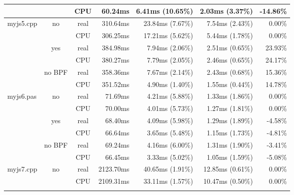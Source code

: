 \documentclass[en]{pracamgr}
\begin{document}
\begin{appendices}
\begin{small}
\begin{longtable}{|l|c|c|r|r|r|r|}
                            &                         & CPU  & 60.24ms & 6.41ms (10.65\%) & 2.03ms (3.37\%) & -14.86\% \\
\hline
\multirow{6}{*}{myjs5.cpp}  & \multirow{2}{*}{no}     & real & 310.64ms & 23.84ms (7.67\%) & 7.54ms (2.43\%) & 0.00\% \\*
                            &                         & CPU  & 306.25ms & 17.21ms (5.62\%) & 5.44ms (1.78\%) & 0.00\% \\*
                            \cline{2-7}
                            & \multirow{2}{*}{yes}    & real & 384.98ms & 7.94ms (2.06\%) & 2.51ms (0.65\%) & 23.93\% \\*
                            &                         & CPU  & 380.27ms & 7.79ms (2.05\%) & 2.46ms (0.65\%) & 24.17\% \\*
                            \cline{2-7}
                            & \multirow{2}{*}{no BPF} & real & 358.36ms & 7.67ms (2.14\%) & 2.43ms (0.68\%) & 15.36\% \\*
                            &                         & CPU  & 351.52ms & 4.90ms (1.40\%) & 1.55ms (0.44\%) & 14.78\% \\
\hline
\multirow{6}{*}{myjs6.pas}  & \multirow{2}{*}{no}     & real & 71.69ms & 4.21ms (5.88\%) & 1.33ms (1.86\%) & 0.00\% \\*
                            &                         & CPU  & 70.00ms & 4.01ms (5.73\%) & 1.27ms (1.81\%) & 0.00\% \\*
                            \cline{2-7}
                            & \multirow{2}{*}{yes}    & real & 68.40ms & 4.09ms (5.98\%) & 1.29ms (1.89\%) & -4.58\% \\*
                            &                         & CPU  & 66.64ms & 3.65ms (5.48\%) & 1.15ms (1.73\%) & -4.81\% \\*
                            \cline{2-7}
                            & \multirow{2}{*}{no BPF} & real & 69.24ms & 4.16ms (6.00\%) & 1.31ms (1.90\%) & -3.41\% \\*
                            &                         & CPU  & 66.45ms & 3.33ms (5.02\%) & 1.05ms (1.59\%) & -5.08\% \\
\hline
\multirow{6}{*}{myjs7.cpp}  & \multirow{2}{*}{no}     & real & 2123.70ms & 40.65ms (1.91\%) & 12.85ms (0.61\%) & 0.00\% \\*
                            &                         & CPU  & 2109.31ms & 33.11ms (1.57\%) & 10.47ms (0.50\%) & 0.00\% \\*

\end{longtable}
\end{small}
\end{appendices}
\end{document}
